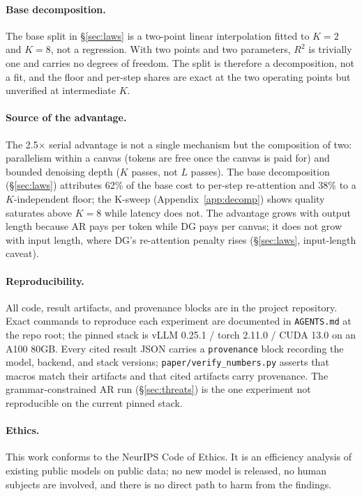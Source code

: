 \paragraph{Base decomposition.}

The base split in \S\ref{sec:laws} is a two-point linear interpolation
fitted to $K{=}2$ and $K{=}8$, not a regression. With two points and
two parameters, $R^2$ is trivially one and carries no degrees of
freedom. The split is therefore a decomposition, not a fit, and the
floor and per-step shares are exact at the two operating points but
unverified at intermediate $K$.

\paragraph{Source of the advantage.}

The 2.5$\times$ serial advantage is not a single mechanism but the
composition of two: parallelism within a canvas (tokens are free once
the canvas is paid for) and bounded denoising depth ($K$ passes, not
$L$ passes). The base decomposition (\S\ref{sec:laws}) attributes
62\% of the base cost to per-step re-attention and 38\% to a
$K$-independent floor; the K-sweep (Appendix~\ref{app:decomp}) shows
quality saturates above $K{=}8$ while latency does not. The advantage
grows with output length because AR pays per token while DG pays per
canvas; it does not grow with input length, where DG's re-attention
penalty rises (\S\ref{sec:laws}, input-length caveat).

\paragraph{Reproducibility.}

All code, result artifacts, and provenance blocks are in the project
repository. Exact commands to reproduce each experiment are documented
in \texttt{AGENTS.md} at the repo root; the pinned stack is
vLLM 0.25.1 / torch 2.11.0 / CUDA 13.0 on an A100 80GB. Every cited
result JSON carries a \texttt{provenance} block recording the model,
backend, and stack versions; \texttt{paper/verify\_numbers.py} asserts
that macros match their artifacts and that cited artifacts carry
provenance. The grammar-constrained AR run (\S\ref{sec:threats}) is
the one experiment not reproducible on the current pinned stack.

\paragraph{Ethics.}

This work conforms to the NeurIPS Code of Ethics. It is an efficiency
analysis of existing public models on public data; no new model is
released, no human subjects are involved, and there is no direct path
to harm from the findings.

